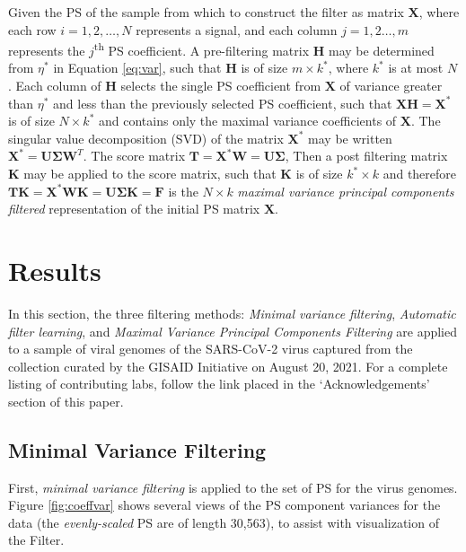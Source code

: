 \documentclass[10pt,conference]{IEEEtran}
\begin{document}
Given the PS of the sample from which to construct the filter as matrix $\pmb{X}$, where each row $i=1,2,\dots,N$ represents a signal, and each column $j=1,2\dots,m$ represents the $j$\textsuperscript{th} PS coefficient.  
A pre-filtering matrix $\pmb{H}$ may be determined from $\eta^*$ in Equation \ref{eq:var}, such that $\pmb{H}$ is of size $m \times k^*$, where $k^*$ is at most $N$. Each column of $\pmb{H}$ selects the single PS coefficient from $\pmb{X}$ of variance greater than $\eta^*$ and less than the previously selected PS coefficient, such that $\pmb{X}\pmb{H} = \pmb{X^*}$ is of size $N \times k^*$ and contains only the maximal variance coefficients of $\pmb{X}$.  The singular value decomposition (SVD) of the matrix $\pmb{X^*}$ may be written $\pmb{X^*} = \pmb{U}\pmb{\Sigma}\pmb{W}^T$.  The score matrix $\pmb{T} =\pmb{X^*}\pmb{W} = \pmb{U}\pmb{\Sigma}$, Then a post filtering matrix $\pmb{K}$ may 
be applied to the score matrix, such that $\pmb{K}$ is of size $k^* \times k$ and therefore $\pmb{T}\pmb{K} = \pmb{X^*}\pmb{W}\pmb{K} = \pmb{U}\pmb{\Sigma}\pmb{K} = \pmb{F}$ is the $N \times k$ \textit{maximal variance principal components filtered} representation of the initial PS matrix $\pmb{X}$. 

\section{Results} 
\label{sec:res}

\noindent In this section, the three filtering methods: \textit{Minimal variance filtering}, \textit{Automatic filter learning}, and \textit{Maximal Variance Principal Components Filtering} are applied to a sample of viral genomes of the SARS-CoV-2 virus captured from the collection curated by the GISAID Initiative \cite{gisaid} on August 20, 2021.  For a complete listing of contributing labs, follow the link placed in the `Acknowledgements' section of this paper. 

\subsection{Minimal Variance Filtering} 

\noindent First, \textit{minimal variance filtering} is applied to the set of PS for the virus genomes. 
Figure \ref{fig:coeffvar} shows several views of the PS component variances for the data (the \textit{evenly-scaled} PS are of length 30,563), to assist with visualization of the Filter.
\end{document}
